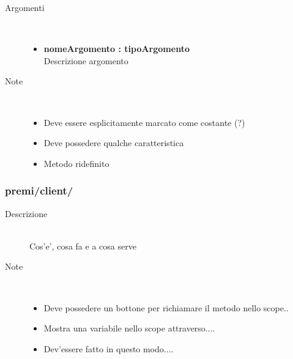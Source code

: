 \begin{description}
\begin{description}
		\begin{description}
			\item[Argomenti] \hfill \\
				\begin{itemize}
				
					\item \textbf{nomeArgomento : tipoArgomento			} \hfill \\
					Descrizione argomento
					
				\end{itemize}
			\item[Note] \hfill \\
			\begin{itemize}
					\item Deve essere esplicitamente marcato come costante (?)
					\item Deve possedere qualche caratteristica
					\item Metodo ridefinito
			\end{itemize}
		\end{description}
	\end{description}

\end{description}






\subsubsection{premi/client/}

\begin{description}
\item[Descrizione] \hfill \\
	Cos'e', cosa fa e a cosa serve
\item[Note] \hfill \\
	\begin{itemize}
			\item Deve possedere un bottone per richiamare il metodo nello scope..
			\item Mostra una variabile nello scope attraverso....
			\item Dev'essere fatto in questo modo....
	\end{itemize}
\end{description}